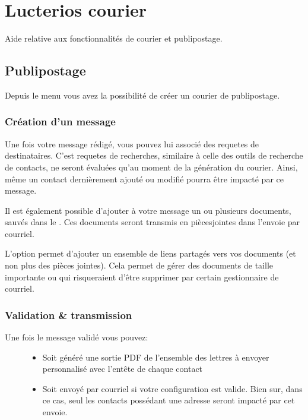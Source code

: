\documentclass[letterpaper,10pt,french]{sphinxmanual}
\begin{document}
\chapter{Lucterios courier}
\label{\detokenize{mailing/index:lucterios-courier}}\label{\detokenize{mailing/index::doc}}
Aide relative aux fonctionnalités de courier et publipostage.


\section{Publipostage}
\label{\detokenize{mailing/mailing:publipostage}}\label{\detokenize{mailing/mailing::doc}}
Depuis le menu  vous avez la possibilité de créer un courier de publipostage.


\subsection{Création d’un message}
\label{\detokenize{mailing/mailing:creation-d-un-message}}
Une fois votre message rédigé, vous pouvez lui associé des requetes de destinataires.
C’est requetes de recherches, similaire à celle des outils de recherche de contacts, ne seront évaluées qu’au moment de la génération du courier.
Ainsi, même un contact dernièrement ajouté ou modifié pourra être impacté par ce message.

Il est également possible d’ajouter à votre message un ou plusieurs documents, sauvés dans le .
Ces documents seront transmis en pièces\sphinxhyphen{}jointes dans l’envoie par courriel.

L’option  permet d’ajouter un ensemble de liens partagés vers vos documents (et non plus des pièces jointes).
Cela permet de gérer des documents de taille importante ou qui risqueraient d’être supprimer par certain gestionnaire de courriel.

\noindent{}


\subsection{Validation \& transmission}
\label{\detokenize{mailing/mailing:validation-transmission}}\begin{description}
\item[{Une fois le message validé vous pouvez:}] \leavevmode\begin{itemize}
\item {} 
Soit généré une sortie PDF de l’ensemble des lettres à envoyer personnalisé avec l’entête de chaque contact

\item {} 
Soit envoyé par courriel si votre configuration est valide. Bien sur, dans ce cas, seul les contacts possédant une adresse seront impacté par cet envoie.

\end{itemize}

\end{description}
\end{document}
